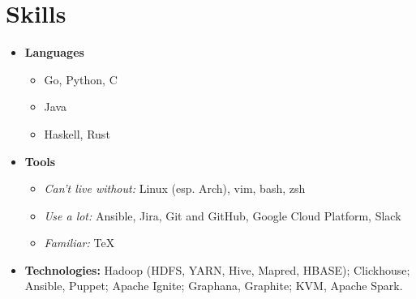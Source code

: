 \documentclass[letterpaper,10pt]{article}
\begin{document}
\begin{minipage}[t]{0.33\textwidth} 

\section{Skills}
\begin{itemize}[leftmargin=*]
	\item{ \textbf{Languages}{\vspace{-8pt}}
		 \begin{itemize}
			 \item{Go, Python, C}
			 \item{Java}
			 \item{Haskell, Rust}
		\end{itemize}
    }
	\item{ \textbf{Tools}{\vspace{-8pt}}
		 \begin{itemize}
			 \item{\textit{\small{Can't live without:}}\newline}
			Linux (esp. Arch), vim, bash, zsh
			  \item{\textit{\small{Use a lot:}}\newline}
			 Ansible, Jira, Git and GitHub, Google Cloud Platform, Slack
			 \item{\textit{\small{Familiar:}}\newline}
			 TeX
		\end{itemize}

    }
	\item{ \textbf{Technologies:}{\vspace{-0pt}}\newline
		Hadoop (HDFS, YARN, Hive, Mapred, HBASE); \newline
		Clickhouse;                             \newline
		Ansible, Puppet;                        \newline
		Apache Ignite;                           \newline
		Graphana, Graphite;                      \newline
		KVM, Apache Spark.
    }
 \end{itemize}
 



\end{minipage}
\end{document}
